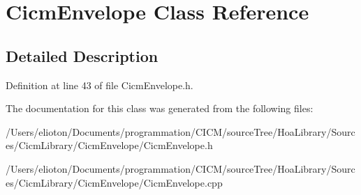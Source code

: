\hypertarget{class_cicm_envelope}{\section{Cicm\-Envelope Class Reference}
\label{class_cicm_envelope}
}


\subsection{Detailed Description}


Definition at line 43 of file Cicm\-Envelope.\-h.



The documentation for this class was generated from the following files\-:\begin{DoxyCompactItemize}
\item 
/\-Users/elioton/\-Documents/programmation/\-C\-I\-C\-M/source\-Tree/\-Hoa\-Library/\-Sources/\-Cicm\-Library/\-Cicm\-Envelope/Cicm\-Envelope.\-h\item 
/\-Users/elioton/\-Documents/programmation/\-C\-I\-C\-M/source\-Tree/\-Hoa\-Library/\-Sources/\-Cicm\-Library/\-Cicm\-Envelope/Cicm\-Envelope.\-cpp\end{DoxyCompactItemize}
